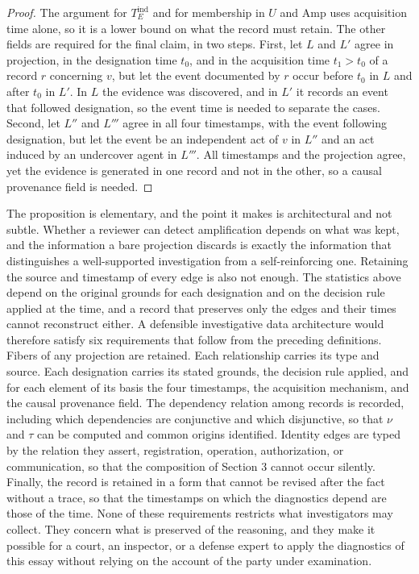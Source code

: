 \documentclass[11pt]{article}
\theoremstyle{definition}
\theoremstyle{remark}
\begin{document}
\begin{proof}
The argument for $T_E^{\mathrm{ind}}$ and for membership in $U$ and $\mathrm{Amp}$ uses acquisition time alone, so it is a lower bound on what the record must retain. The other fields are required for the final claim, in two steps. First, let $L$ and $L'$ agree in projection, in the designation time $t_0$, and in the acquisition time $t_1 > t_0$ of a record $r$ concerning $v$, but let the event documented by $r$ occur before $t_0$ in $L$ and after $t_0$ in $L'$. In $L$ the evidence was discovered, and in $L'$ it records an event that followed designation, so the event time is needed to separate the cases. Second, let $L''$ and $L'''$ agree in all four timestamps, with the event following designation, but let the event be an independent act of $v$ in $L''$ and an act induced by an undercover agent in $L'''$. All timestamps and the projection agree, yet the evidence is generated in one record and not in the other, so a causal provenance field is needed.
\end{proof}

The proposition is elementary, and the point it makes is architectural and not subtle. Whether a reviewer can detect amplification depends on what was kept, and the information a bare projection discards is exactly the information that distinguishes a well-supported investigation from a self-reinforcing one. Retaining the source and timestamp of every edge is also not enough. The statistics above depend on the original grounds for each designation and on the decision rule applied at the time, and a record that preserves only the edges and their times cannot reconstruct either. A defensible investigative data architecture would therefore satisfy six requirements that follow from the preceding definitions. Fibers of any projection are retained. Each relationship carries its type and source. Each designation carries its stated grounds, the decision rule applied, and for each element of its basis the four timestamps, the acquisition mechanism, and the causal provenance field. The dependency relation among records is recorded, including which dependencies are conjunctive and which disjunctive, so that $\nu$ and $\tau$ can be computed and common origins identified. Identity edges are typed by the relation they assert, registration, operation, authorization, or communication, so that the composition of Section 3 cannot occur silently. Finally, the record is retained in a form that cannot be revised after the fact without a trace, so that the timestamps on which the diagnostics depend are those of the time. None of these requirements restricts what investigators may collect. They concern what is preserved of the reasoning, and they make it possible for a court, an inspector, or a defense expert to apply the diagnostics of this essay without relying on the account of the party under examination.
\end{document}
